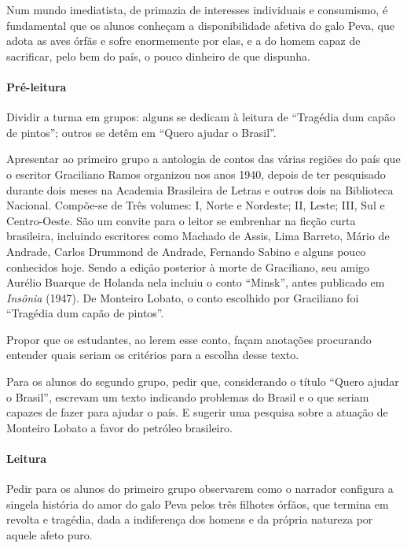 \documentclass[11pt]{extarticle}
\begin{document}
Num mundo imediatista, de primazia de interesses individuais e
consumismo, é fundamental que os alunos conheçam a disponibilidade
afetiva do galo Peva, que adota as aves órfãs e sofre enormemente por
elas, e a do homem capaz de sacrificar, pelo bem do país, o pouco
dinheiro de que dispunha.

\asterisc\paragraph{Pré-leitura}

Dividir a turma em grupos: alguns se dedicam à leitura de ``Tragédia dum
capão de pintos''; outros se detêm em ``Quero ajudar o Brasil''.

Apresentar ao primeiro grupo a antologia de contos das várias regiões do
país que o escritor Graciliano Ramos organizou nos anos 1940, depois de
ter pesquisado durante dois meses na Academia Brasileira de Letras e
outros dois na Biblioteca Nacional. Compõe-se de Três volumes: I, Norte
e Nordeste; II, Leste; III, Sul e Centro-Oeste. São um convite para o
leitor se embrenhar na ficção curta brasileira, incluindo escritores
como Machado de Assis, Lima Barreto, Mário de Andrade, Carlos Drummond
de Andrade, Fernando Sabino e alguns pouco conhecidos hoje. Sendo a
edição posterior à morte de Graciliano, seu amigo Aurélio Buarque de
Holanda nela incluiu o conto ``Minsk'', antes publicado em
\emph{Insônia} (1947). De Monteiro Lobato, o conto escolhido por
Graciliano foi ``Tragédia dum capão de pintos''.

Propor que os estudantes, ao lerem esse conto, façam anotações
procurando entender quais seriam os critérios para a escolha desse
texto.

Para os alunos do segundo grupo, pedir que, considerando o título
``Quero ajudar o Brasil'', escrevam um texto indicando problemas do
Brasil e o que seriam capazes de fazer para ajudar o país. E sugerir uma
pesquisa sobre a atuação de Monteiro Lobato a favor do petróleo
brasileiro.

\asterisc\paragraph{Leitura}

Pedir para os alunos do primeiro grupo observarem como o narrador
configura a singela história do amor do galo Peva pelos três filhotes
órfãos, que termina em revolta e tragédia, dada a indiferença dos homens
e da própria natureza por aquele afeto puro.
\end{document}
